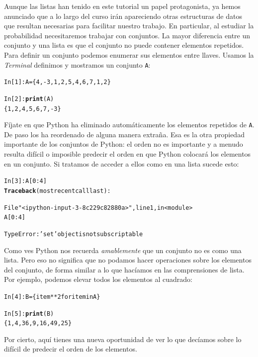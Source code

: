 \documentclass[10pt,a4paper]{article}\usepackage[]{graphicx}\usepackage[]{color}
\makeatletter
\newcommand{\hlstr}[1]{\textcolor[rgb]{0.192,0.494,0.8}{#1}}%
\newcommand{\hlkwd}[1]{\textcolor[rgb]{0.737,0.353,0.396}{\textbf{#1}}}%
\newenvironment{kframe}{%
 \def\at@end@of@kframe{}%
 \ifinner\ifhmode%
  \def\at@end@of@kframe{\end{minipage}}%
  \begin{minipage}{\columnwidth}%
 \fi\fi%
 \def\FrameCommand##1{\hskip\@totalleftmargin \hskip-\fboxsep
 \colorbox{shadecolor}{##1}\hskip-\fboxsep
     \hskip-\linewidth \hskip-\@totalleftmargin \hskip\columnwidth}%
 \MakeFramed {\advance\hsize-\width
   \@totalleftmargin\z@ \linewidth\hsize
   \@setminipage}}%
 {\par\unskip\endMakeFramed%
 \at@end@of@kframe}
\newenvironment{knitrout}{}{} %
\newcounter {cont01}
\makeatother
\begin{document}
Aunque las listas han tenido en este tutorial un papel protagonista, ya hemos anunciado que a lo largo del curso irán apareciendo otras estructuras de datos que resultan necesarias para facilitar nuestro trabajo. En particular, al estudiar la probabilidad necesitaremos trabajar con {\sf conjuntos}. La mayor diferencia entre un conjunto y una lista es que el conjunto no puede contener elementos repetidos. Para definir un conjunto podemos enumerar sus elementos entre llaves. Usamos la {\em Terminal} definimos y mostramos un conjunto {\tt A}:
\begin{knitrout}
\color{fgcolor}\begin{kframe}
\begin{alltt}
In [1]: A = \{4, -3, 1, 2, 5, 4, 6, 7, 1, 2\}

In [2]: \hlkwd{print}(A)
\{1, 2, 4, 5, 6, 7, -3\}
\end{alltt}
\end{kframe}
\end{knitrout}
Fíjate en que Python ha eliminado automáticamente los elementos repetidos de {\tt A}. De paso los ha reordenado de alguna manera extraña. Esa es la otra propiedad importante de los conjuntos de Python: el orden no es importante y a menudo resulta difícil o imposible predecir el orden en que Python colocará los elementos en un conjunto. Si tratamos de acceder a ellos como en una lista sucede esto:
\begin{knitrout}
\color{fgcolor}\begin{kframe}
\begin{alltt}
In [3]: A[0:4]
\hlkwd{Traceback} (most recent call last):

  File \hlstr{"<ipython-input-3-8c229c82880a>"}, line 1, in <module>
    A[0:4]

TypeError: \hlstr{'set'} object is not subscriptable
\end{alltt}
\end{kframe}
\end{knitrout}
Como ves Python nos recuerda {\em amablemente} que un conjunto no es como una lista. Pero eso no significa que no podamos hacer operaciones sobre los elementos del conjunto, de forma similar a lo que hacíamos en las comprensiones de lista. Por ejemplo, podemos elevar todos los elementos al cuadrado:
\begin{knitrout}
\color{fgcolor}\begin{kframe}
\begin{alltt}
In [4]: B = \{item**2 for item in A\}

In [5]: \hlkwd{print}(B)
\{1, 4, 36, 9, 16, 49, 25\}
\end{alltt}
\end{kframe}
\end{knitrout}
Por cierto, aquí tienes una nueva oportunidad de ver lo que decíamos sobre lo difícil de predecir el orden de los elementos.
\end{document}
